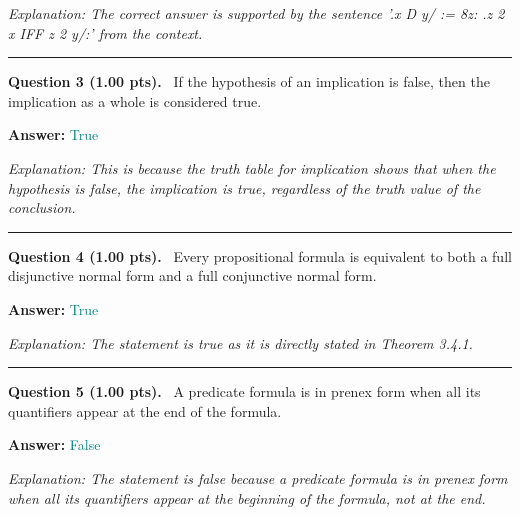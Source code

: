 \documentclass[12pt,a4paper]{article}
\begin{document}
\textit{\small Explanation: The correct answer is supported by the sentence '.x D y/ := 8z: .z 2 x IFF z 2 y/:' from the context.}



\vspace{0.8em}
\noindent\rule{\linewidth}{0.2pt}
\vspace{0.3em}


\noindent
\textbf{Question 3 (1.00 pts).}~
If the hypothesis of an implication is false, then the implication as a whole is considered true.


\textbf{Answer:} \textcolor{teal}{True}



\textit{\small Explanation: This is because the truth table for implication shows that when the hypothesis is false, the implication is true, regardless of the truth value of the conclusion.}



\vspace{0.8em}
\noindent\rule{\linewidth}{0.2pt}
\vspace{0.3em}


\noindent
\textbf{Question 4 (1.00 pts).}~
Every propositional formula is equivalent to both a full disjunctive normal form and a full conjunctive normal form.


\textbf{Answer:} \textcolor{teal}{True}



\textit{\small Explanation: The statement is true as it is directly stated in Theorem 3.4.1.}



\vspace{0.8em}
\noindent\rule{\linewidth}{0.2pt}
\vspace{0.3em}


\noindent
\textbf{Question 5 (1.00 pts).}~
A predicate formula is in prenex form when all its quantifiers appear at the end of the formula.


\textbf{Answer:} \textcolor{teal}{False}



\textit{\small Explanation: The statement is false because a predicate formula is in prenex form when all its quantifiers appear at the beginning of the formula, not at the end.}
\end{document}
